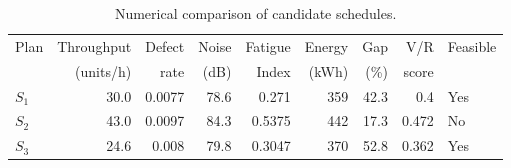 \begin{table}[htbp]
\centering
\caption{Numerical comparison of candidate schedules.}
\label{tab:numerical-sim}
\small
\begin{tabular}{@{}lrrrrrrrl@{}}
\toprule
Plan & Throughput & Defect & Noise & Fatigue & Energy & Gap & V/R & Feasible \\
     & (units/h)  & rate   & (dB)  & Index   & (kWh)  & (\%) & score &         \\
\midrule
$S_{1}$ & 30.0 & 0.0077 & 78.6 & 0.271 & 359 & 42.3 & 0.4 & Yes \\
$S_{2}$ & 43.0 & 0.0097 & 84.3 & 0.5375 & 442 & 17.3 & 0.472 & No \\
$S_{3}$ & 24.6 & 0.008 & 79.8 & 0.3047 & 370 & 52.8 & 0.362 & Yes \\
\bottomrule
\end{tabular}
\end{table}
